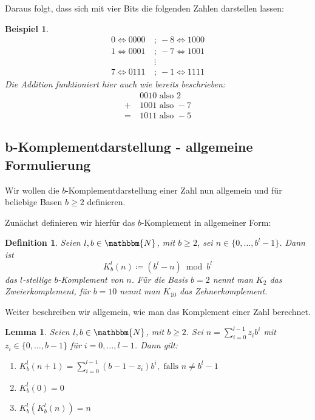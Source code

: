 \documentclass{article}
\newcommand{\N}{\mathbbm{N}} %
\newtheorem{definition}[satz]{Definition}
\newtheorem{lemma}[satz]{Lemma}
\newtheorem{beispiel}[satz]{Beispiel}
\begin{document}
    Daraus folgt, dass sich mit vier Bits die folgenden Zahlen darstellen lassen:
    \begin{beispiel} \label{bsp:Komplementdarstellung_4Bits}
      \begin{align*}
        0 \Leftrightarrow 0000  ~&;~  -8 \Leftrightarrow 1000 \\
        1 \Leftrightarrow 0001  ~&;~  -7 \Leftrightarrow 1001 \\
        & \vdots \\
        7 \Leftrightarrow 0111  ~&;~  -1 \Leftrightarrow 1111
      \end{align*}    
      Die Addition funktioniert hier auch wie bereits beschrieben:
      \begin{align*}
        &0010 \text{ also } 2 \\
        +~ &1001 \text{ also } -7 \\
        =~ &1011 \text{ also } -5
      \end{align*}
    \end{beispiel}

\subsection{b-Komplementdarstellung - allgemeine Formulierung}

  Wir wollen die $b$-Komplementdarstellung einer Zahl nun allgemein und für beliebige Basen $b \geq 2$ definieren.

  Zunächst definieren wir hierfür das $b$-Komplement in allgemeiner Form:

  \begin{definition} \label{def:b-Komplement}
    Seien $l,b \in \N$, mit $b\geq 2$, sei $n \in \{0, \dots, b^l-1\}$.
    Dann ist 
    \[K^l_b(n) \coloneq (b^l-n) \bmod b^l\]
    das $l$-stellige $b$-Komplement von $n$.
    Für die Basis $b=2$ nennt man $K_2$ das Zweierkomplement, für $b=10$ nennt man $K_{10}$ das Zehnerkomplement.
  \end{definition}
  
  Weiter beschreiben wir allgemein, wie man das Komplement einer Zahl berechnet.

  \begin{lemma} \label{lem:b-Komplement_berechnen}
    Seien $l,b \in \N$, mit $b\geq 2$. Sei $n=\sum_{i=0}^{l-1} z_ib^i$ mit $z_i \in \{0, \dots, b-1\}$ für $i = 0, \dots, l-1$.
    Dann gilt:
    \begin{enumerate}[label=(\roman*)]
      \item $K^l_b(n+1) = \displaystyle\sum_{i=0}^{l-1}(b-1-z_i)b^i, \text{ falls } n\neq b^l-1$ \label{lem:b-Komplement_berechnen_Berechnung}
      \item $K^l_b(0)=0$ \label{lem:b-Komplement_berechnen_von0} 
      \item $K^l_b(K^l_b(n))=n$ \label{lem:b-Komplement_berechnen_KomplementKomplement} 
    \end{enumerate}
  \end{lemma}
\end{document}
